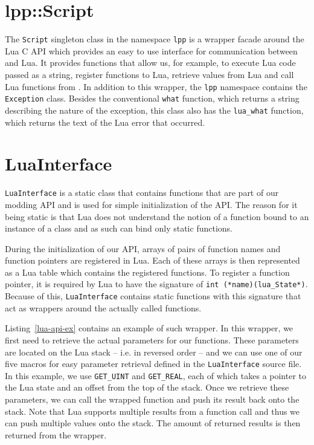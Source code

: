\section{lpp::Script}

The \texttt{Script} singleton class in the namespace \texttt{lpp} is a wrapper facade around the Lua C API which provides an easy to use
interface for communication between \cpp and Lua. It provides functions that allow us, for example, to execute Lua code passed as a string,
register \cpp functions to Lua, retrieve values from Lua and call Lua functions from \cpp. In addition to this wrapper, the \texttt{lpp}
namespace contains the \texttt{Exception} class. Besides the conventional \texttt{what} function, which returns a string describing the
nature of the exception, this class also has the \texttt{lua\_what} function, which returns the text of the Lua error that occurred.

\section{LuaInterface}

\texttt{LuaInterface} is a static class that contains functions that are part of our modding API and is used for simple initialization
of the API. The reason for it being static is that Lua does not understand the notion of a function bound to an instance of a class
and as such can bind only static functions.

During the initialization of our API, arrays of pairs of function names and function pointers are registered in Lua. Each of
these arrays is then represented as a Lua table which contains the registered functions.
To register a function pointer, it is required by Lua to have the signature of \texttt{int (*name)(lua\_State*)}. Because of this,
\texttt{LuaInterface} contains static functions with this signature that act as wrappers around the actually called functions.

Listing~\ref{lua-api-ex} contains an example of such wrapper. In this wrapper, we first need to retrieve the actual parameters for our
functions. These parameters are located on the Lua stack -- i.e. in reversed order -- and we can use one of our five macros for easy
parameter retrieval defined in the \texttt{LuaInterface} source file. In this example, we use \texttt{GET\_UINT} and \texttt{GET\_REAL},
each of which takes a pointer to the Lua state and an offset from the top of the stack. Once we retrieve these parameters, we can call the
wrapped function and push its result back onto the stack. Note that Lua supports multiple results from a function call and thus we can
push multiple values onto the stack. The amount of returned results is then returned from the wrapper.


